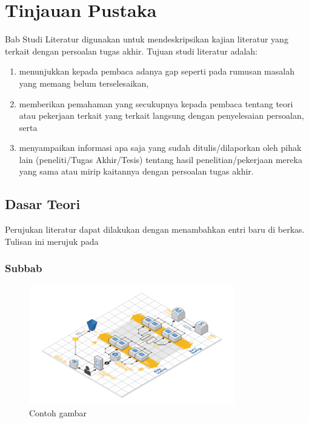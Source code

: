 \chapter{Tinjauan Pustaka}

Bab Studi Literatur digunakan untuk mendeskripsikan kajian literatur yang terkait dengan persoalan tugas akhir. Tujuan studi literatur adalah:

\begin{enumerate}
    \item menunjukkan kepada pembaca adanya gap seperti pada rumusan masalah yang memang belum terselesaikan,
    \item memberikan pemahaman yang secukupnya kepada pembaca tentang teori atau pekerjaan terkait yang terkait langsung dengan penyelesaian persoalan, serta
    \item menyampaikan informasi apa saja yang sudah ditulis/dilaporkan oleh pihak lain (peneliti/Tugas Akhir/Tesis) tentang hasil penelitian/pekerjaan mereka yang sama atau mirip kaitannya dengan persoalan tugas akhir.
\end{enumerate}

\blindtext

\section{Dasar Teori}
Perujukan literatur dapat dilakukan dengan menambahkan entri baru di berkas. Tulisan ini merujuk pada \cite{knuth2001art}

    \subsection{Subbab}

    \blindtext

    \begin{figure}[h]
        \centering
        \includegraphics[width=0.8\textwidth]{figures/chapter-2-infrastructure-diagram.png}
        \caption{Contoh gambar}
        \label{fig:1}
    \end{figure}

